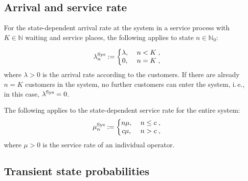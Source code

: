 \documentclass[a4paper,11pt,oneside]{article}
\theoremstyle{definition}
\begin{document}
\subsection{Arrival and service rate}

For the state-dependent arrival rate at the system in a service process with $K\in\mathbb{N}$ waiting and service places, the following applies to state $n\in\mathbb{N}_0$:

\begin{equation}\label{GleichungMarkovAnkunftsrate}
\lambda_n^{\rm Sys}:=\left\{\begin{matrix}
\lambda,&~n<K\;,\\
0,&~n=K\;,
\end{matrix}\right.
\end{equation}
where $\lambda>0$ is the arrival rate according to the customers. If there are already $n=K$ customers in the system, no further customers can enter the system, i.\,e., in this case, $\lambda^{\rm Sys}=0$.

The following applies to the state-dependent service rate for the entire system:
\begin{equation}\label{GleichungMarkovBedienrate}
\mu_n^{\rm Sys}:=\left\{\begin{matrix}
n\mu,&~n\le c\;,\\
c\mu,&~n>c\;,
\end{matrix}\right.
\end{equation}
where $\mu>0$ is the service rate of an individual operator.

\subsection{Transient state probabilities}
\end{document}
